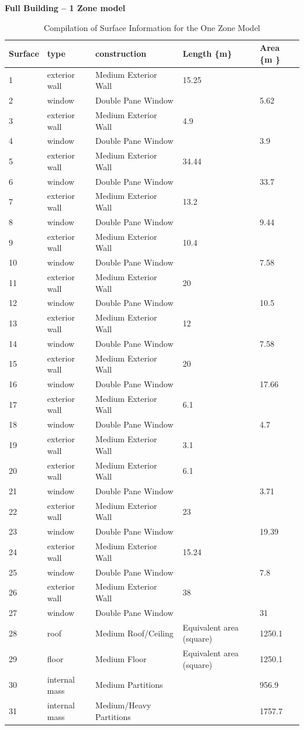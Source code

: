 \textbf{Full Building -- 1 Zone model}

\begin{longtable}[c]{p{1.2in}p{1.2in}p{1.2in}p{1.2in}p{1.2in}}
\caption{Compilation of Surface Information for the One Zone Model \protect \label{table:compilation-of-surface-information-for}}\\
\toprule 
Surface & type & construction & Length \{m\} & Area \{m  \} \tabularnewline \midrule
\endhead
1 & exterior wall & Medium Exterior Wall & 15.25 & ~ \tabularnewline
2 & window & Double Pane Window & ~ & 5.62 \tabularnewline
3 & exterior wall & Medium Exterior Wall & 4.9 & ~ \tabularnewline
4 & window & Double Pane Window & ~ & 3.9 \tabularnewline
5 & exterior wall & Medium Exterior Wall & 34.44 & ~ \tabularnewline
6 & window & Double Pane Window & ~ & 33.7 \tabularnewline
7 & exterior wall & Medium Exterior Wall & 13.2 & ~ \tabularnewline
8 & window & Double Pane Window & ~ & 9.44 \tabularnewline
9 & exterior wall & Medium Exterior Wall & 10.4 & ~ \tabularnewline
10 & window & Double Pane Window & ~ & 7.58 \tabularnewline
11 & exterior wall & Medium Exterior Wall & 20 & ~ \tabularnewline
12 & window & Double Pane Window & ~ & 10.5 \tabularnewline
13 & exterior wall & Medium Exterior Wall & 12 & ~ \tabularnewline
14 & window & Double Pane Window & ~ & 7.58 \tabularnewline
15 & exterior wall & Medium Exterior Wall & 20 & ~ \tabularnewline
16 & window & Double Pane Window & ~ & 17.66 \tabularnewline
17 & exterior wall & Medium Exterior Wall & 6.1 & ~ \tabularnewline
18 & window & Double Pane Window & ~ & 4.7 \tabularnewline
19 & exterior wall & Medium Exterior Wall & 3.1 & ~ \tabularnewline
20 & exterior wall & Medium Exterior Wall & 6.1 & ~ \tabularnewline
21 & window & Double Pane Window & ~ & 3.71 \tabularnewline
22 & exterior wall & Medium Exterior Wall & 23 & ~ \tabularnewline
23 & window & Double Pane Window & ~ & 19.39 \tabularnewline
24 & exterior wall & Medium Exterior Wall & 15.24 & ~ \tabularnewline
25 & window & Double Pane Window & ~ & 7.8 \tabularnewline
26 & exterior wall & Medium Exterior Wall & 38 & ~ \tabularnewline
27 & window & Double Pane Window & ~ & 31 \tabularnewline
28 & roof & Medium Roof/Ceiling & Equivalent area (square) & 1250.1 \tabularnewline
29 & floor & Medium Floor & Equivalent area (square) & 1250.1 \tabularnewline
30 & internal mass & Medium Partitions & ~ & 956.9 \tabularnewline
31 & internal mass & Medium/Heavy Partitions & ~ & 1757.7 \tabularnewline
\bottomrule
\end{longtable}

